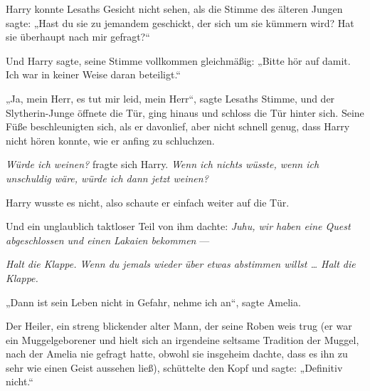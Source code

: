 Harry konnte Lesaths Gesicht nicht sehen, als die Stimme des älteren Jungen sagte:
„Hast du sie zu jemandem geschickt, der sich um sie kümmern wird? Hat sie überhaupt nach mir gefragt?“

Und Harry sagte, seine Stimme vollkommen gleichmäßig:
„Bitte hör auf damit. Ich war in keiner Weise daran beteiligt.“

„Ja, mein Herr, es tut mir leid, mein Herr“, sagte Lesaths Stimme, und der Slytherin-Junge öffnete die Tür, ging hinaus und schloss die Tür hinter sich. Seine Füße beschleunigten sich, als er davonlief, aber nicht schnell genug, dass Harry nicht hören konnte, wie er anfing zu schluchzen.

\emph{Würde ich weinen?} fragte sich Harry. \emph{Wenn ich nichts wüsste, wenn ich unschuldig wäre, würde ich dann jetzt weinen?}

Harry wusste es nicht, also schaute er einfach weiter auf die Tür.

Und ein unglaublich taktloser Teil von ihm dachte: \emph{Juhu, wir haben eine Quest abgeschlossen und einen Lakaien bekommen} —

\emph{Halt die Klappe. Wenn du jemals wieder über etwas abstimmen willst … Halt die Klappe.}


„Dann ist sein Leben nicht in Gefahr, nehme ich an“, sagte Amelia.

Der Heiler, ein streng blickender alter Mann, der seine Roben weis trug (er war ein Muggelgeborener und hielt sich an irgendeine seltsame Tradition der Muggel, nach der Amelia nie gefragt hatte, obwohl sie insgeheim dachte, dass es ihn zu sehr wie einen Geist aussehen ließ), schüttelte den Kopf und sagte:
„Definitiv nicht.“

